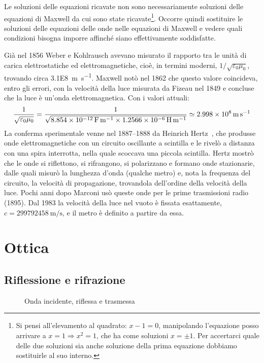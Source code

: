 Le soluzioni delle equazioni ricavate non sono necessariamente soluzioni delle equazioni di Maxwell da cui sono state ricavate\footnote{Si pensi all'elevamento al quadrato: $x-1=0$, manipolando l'equazione posso arrivare a $x=1\Rightarrow x^2=1$, che ha come soluzioni $x=\pm 1$. Per accertarci quale delle due soluzioni sia anche soluzione della prima equazione dobbiamo sostituirle al suo interno.}. Occorre quindi sostituire le soluzioni delle equazioni delle onde nelle equazioni di Maxwell e vedere quali condizioni bisogna imporre affinché siano effettivamente soddisfatte.

\begin{Es}
  Già nel 1856 Weber e Kohlrausch avevano misurato il rapporto tra le unità di carica elettrostatiche ed elettromagnetiche, cioè, in termini moderni, $1/\sqrt{\varepsilon_0\mu_0}$, trovando circa \SI{3.1E8}{\meter\per\second}. Maxwell notò nel 1862 che questo valore coincideva, entro gli errori, con la velocità della luce misurata da Fizeau nel 1849 e concluse che la luce è un'onda elettromagnetica. Con i valori attuali:
  \[
    \frac{1}{\sqrt{\varepsilon_0\mu_0}}=\frac{1}{\sqrt{\SI{8.854E-12}{\farad\per\meter}\times\SI{1.2566E-6}{\henry\per\meter}}}\simeq\SI{2.998E8}{\meter\per\second}
  \]
  La conferma sperimentale venne nel 1887--1888 da Heinrich Hertz~\cite{hertz1888}, che produsse onde elettromagnetiche con un circuito oscillante a scintilla e le rivelò a distanza con una spira interrotta, nella quale scoccava una piccola scintilla. Hertz mostrò che le onde si riflettono, si rifrangono, si polarizzano e formano onde stazionarie, dalle quali misurò la lunghezza d'onda (qualche metro) e, nota la frequenza del circuito, la velocità di propagazione, trovandola dell'ordine della velocità della luce. Pochi anni dopo Marconi usò queste onde per le prime trasmissioni radio (1895). Dal 1983 la velocità della luce nel vuoto è fissata esattamente, $c=\SI{299792458}{\meter\per\second}$, e il metro è definito a partire da essa.
\end{Es}
\chapter{Ottica}
\minitoc
\section{Riflessione e rifrazione}
\begin{figure}[htbp]
  \centering
  
  \caption{Onda incidente, riflessa e trasmessa}
\end{figure}


